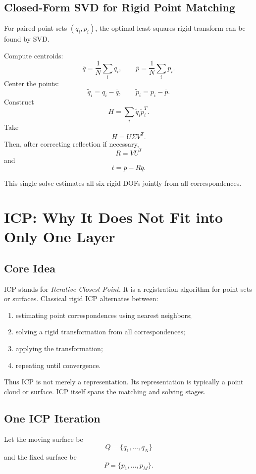 \documentclass[11pt,a4paper]{article}
\begin{document}
\subsection{Closed-Form SVD for Rigid Point Matching}

For paired point sets $(q_i,p_i)$, the optimal least-squares rigid transform can be found by SVD.

Compute centroids:
\[
\bar q=\frac{1}{N}\sum_iq_i,
\qquad
\bar p=\frac{1}{N}\sum_ip_i.
\]
Center the points:
\[
\tilde q_i=q_i-\bar q,
\qquad
\tilde p_i=p_i-\bar p.
\]
Construct
\[
H=\sum_i\tilde q_i\tilde p_i^T.
\]
Take
\[
H=U\Sigma V^T.
\]
Then, after correcting reflection if necessary,
\[
\boxed{R=VU^T}
\]
and
\[
\boxed{t=\bar p-R\bar q}.
\]

This single solve estimates all six rigid DOFs jointly from all correspondences.

\section{ICP: Why It Does Not Fit into Only One Layer}

\subsection{Core Idea}

ICP stands for \emph{Iterative Closest Point}. It is a registration algorithm for point sets or surfaces. Classical rigid ICP alternates between:

\begin{enumerate}
  \item estimating point correspondences using nearest neighbors;
  \item solving a rigid transformation from all correspondences;
  \item applying the transformation;
  \item repeating until convergence.
\end{enumerate}

Thus ICP is not merely a representation. Its representation is typically a point cloud or surface. ICP itself spans the matching and solving stages.

\subsection{One ICP Iteration}

Let the moving surface be
\[
Q=\{q_1,\dots,q_N\}
\]
and the fixed surface be
\[
P=\{p_1,\dots,p_M\}.
\]
\end{document}
